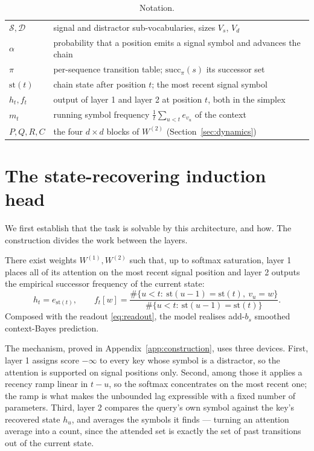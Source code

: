 \begin{table}[!ht]
\caption{Notation.}
\label{tab:notation}
\begin{center}
\begin{tabular}{ll}
\toprule
$\mathcal{S},\mathcal{D}$ & signal and distractor sub-vocabularies, sizes $V_s$, $V_d$ \\
$\alpha$ & probability that a position emits a signal symbol and advances the chain \\
$\pi$ & per-sequence transition table; $\mathrm{succ}_\pi(s)$ its successor set \\
$\mathrm{st}(t)$ & chain state after position $t$; the most recent signal symbol \\
$h_t, f_t$ & output of layer 1 and layer 2 at position $t$, both in the simplex \\
$m_t$ & running symbol frequency $\tfrac1t\sum_{u<t}e_{v_u}$ of the context \\
$P,Q,R,C$ & the four $d\times d$ blocks of $W^{(2)}$ (Section~\ref{sec:dynamics}) \\
\bottomrule
\end{tabular}
\end{center}
\end{table}

\section{The state-recovering induction head}
\label{sec:construction}

We first establish that the task is solvable by this architecture, and how. The construction
divides the work between the layers.

\begin{theorem}[Construction]
\label{thm:construction}
There exist weights $W^{(1)},W^{(2)}$ such that, up to softmax saturation, layer 1 places all of
its attention on the most recent signal position and layer 2 outputs the empirical successor
frequency of the current state:
\begin{equation}
h_t=e_{\mathrm{st}(t)},\qquad
f_t[w]=\frac{\#\{u<t:\ \mathrm{st}(u\!-\!1)=\mathrm{st}(t),\ v_u=w\}}
{\#\{u<t:\ \mathrm{st}(u\!-\!1)=\mathrm{st}(t)\}} .
\end{equation}
Composed with the readout \eqref{eq:readout}, the model realises add-$b_s$ smoothed
context-Bayes prediction.
\end{theorem}

The mechanism, proved in Appendix~\ref{app:construction}, uses three devices. First, layer 1
assigns score $-\infty$ to every key whose symbol is a distractor, so the attention is supported
on signal positions only. Second, among those it applies a recency ramp linear in $t-u$, so the
softmax concentrates on the most recent one; the ramp is what makes the unbounded lag expressible
with a fixed number of parameters. Third, layer 2 compares the query's own symbol against the key's
recovered state $h_u$, and averages the symbols it finds --- turning an attention average into a
count, since the attended set is exactly the set of past transitions out of the current state.

